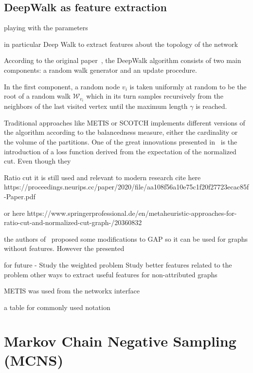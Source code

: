 \subsection{DeepWalk as feature extraction}

playing with the parameters

in particular Deep Walk to extract features about the topology of the network

According to the original paper~\cite{deepwalk}, the DeepWalk algorithm consists of two main components: a random walk generator and an update procedure. 

In the first component, a random node $v_i$ is taken uniformly at random to be the root of a random walk $\mathcal W_{v_i}$ which in its turn samples recursively from the neighbors of the last visited vertex until the maximum length $\gamma$ is reached.

Traditional approaches like METIS or SCOTCH implements different versions of the algorithm according to the balancedness measure, either the cardinality or the volume of the partitions. One of the great innovations presented  in~\cite{gap} is the introduction of a loss function derived from the expectation of the normalized cut. Even though they 

Ratio cut it is still used and relevant to modern research cite here https://proceedings.neurips.cc/paper/2020/file/aa108f56a10e75c1f20f27723ecac85f-Paper.pdf

or here https://www.springerprofessional.de/en/metaheuristic-approaches-for-ratio-cut-and-normalized-cut-graph-/20360832    

the authors of~\cite{gap2} proposed some modifications to GAP so it can be used for graphs without features. However the presented 

for future - Study the weighted problem
Study better features related to the problem
other ways to extract useful features for non-attributed graphs

METIS was used from the networkx interface

a table for commonly used notation



\section{Markov Chain Negative Sampling (MCNS)}
